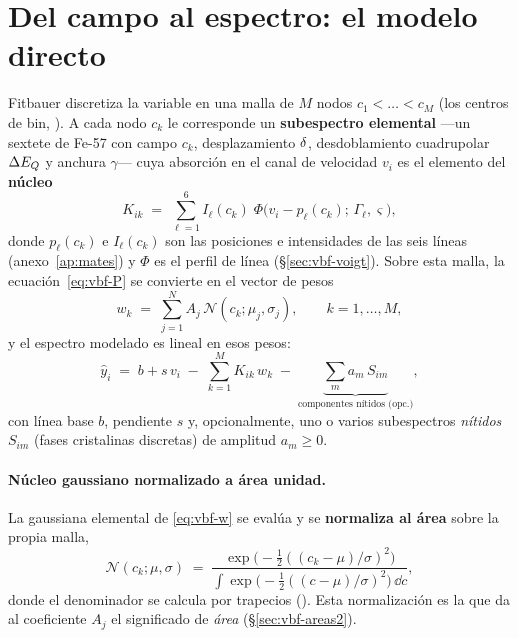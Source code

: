 \section{Del campo al espectro: el modelo directo}
\label{sec:vbf-directo}

Fitbauer discretiza la variable en una malla de $M$ nodos
$c_1<\dots<c_M$ (los centros de bin, ). A cada nodo $c_k$ le
corresponde un \textbf{subespectro elemental} —un sextete de Fe-57 con campo
$c_k$, desplazamiento $\delta$, desdoblamiento cuadrupolar $\Delta E_{Q}$ y anchura $\gamma$—
cuya absorción en el canal de velocidad $v_i$ es el elemento del \textbf{núcleo}
\begin{equation}
  K_{ik} \;=\; \sum_{\ell=1}^{6} I_\ell(c_k)\;
  \Phi\!\bigl(v_i - p_\ell(c_k);\,\Gamma_\ell,\varsigma\bigr),
  \label{eq:vbf-kernel}
\end{equation}
donde $p_\ell(c_k)$ e $I_\ell(c_k)$ son las posiciones e intensidades de las seis
líneas (anexo~\ref{ap:mates}) y $\Phi$ es el perfil de línea
(\S\ref{sec:vbf-voigt}). Sobre esta malla, la ecuación~\eqref{eq:vbf-P} se
convierte en el vector de pesos
\begin{equation}
  w_k \;=\; \sum_{j=1}^{N} A_j\, \mathcal N(c_k;\mu_j,\sigma_j),
  \qquad k=1,\dots,M,
  \label{eq:vbf-w}
\end{equation}
y el espectro modelado es lineal en esos pesos:
\begin{equation}
  \hat y_i \;=\; b + s\,v_i \;-\; \sum_{k=1}^{M} K_{ik}\,w_k
  \;-\; \underbrace{\sum_{m} a_m\,S_{im}}_{\text{componentes nítidos (opc.)}},
  \label{eq:vbf-model}
\end{equation}
con línea base $b$, pendiente $s$ y, opcionalmente, uno o varios subespectros
\emph{nítidos} $S_{im}$ (fases cristalinas discretas) de amplitud $a_m\ge0$.

\paragraph{Núcleo gaussiano normalizado a área unidad.} La gaussiana elemental de
\eqref{eq:vbf-w} se evalúa y se \textbf{normaliza al área} sobre la propia malla,
\begin{equation}
  \mathcal N(c_k;\mu,\sigma) \;=\;
  \frac{\exp\!\bigl(-\tfrac12((c_k-\mu)/\sigma)^2\bigr)}
       {\displaystyle\int \exp\!\bigl(-\tfrac12((c-\mu)/\sigma)^2\bigr)\,\dd c},
  \label{eq:vbf-gauss}
\end{equation}
donde el denominador se calcula por trapecios (). Esta
normalización es la que da al coeficiente $A_j$ el significado de \emph{área}
(\S\ref{sec:vbf-areas2}).

